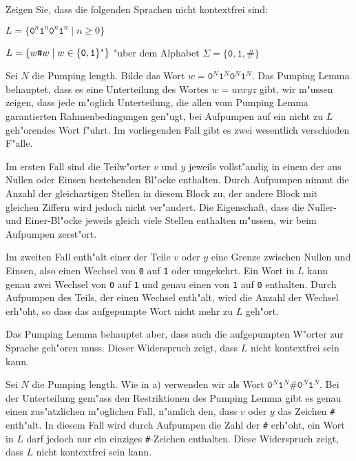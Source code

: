 Zeigen Sie, dass die folgenden Sprachen nicht kontextfrei sind:
\begin{teilaufgaben}
\item $L=\{\texttt{0}^n\texttt{1}^n\texttt{0}^n\texttt{1}^n\;|\;n\ge 0\}$
\item $L=\{w{\texttt{\#}}w\;|\;w\in\{{\tt 0},{\tt 1}\}^*\}$ "uber dem Alphabet
$\Sigma=\{\texttt{0},\texttt{1},\texttt{\#}\}$
\end{teilaufgaben}

\begin{loesung}
\begin{teilaufgaben}
\item Sei $N$ die Pumping length.
Bilde das Wort $w=\texttt{0}^N\texttt{1}^N\texttt{0}^N\texttt{1}^N$.
Das Pumping Lemma
behauptet, dass es eine Unterteilung des Wortes $w=uvxyz$ gibt, wir
m"ussen zeigen, dass jede m"oglich Unterteilung, die allen vom
Pumping Lemma garantierten Rahmenbedingungen gen"ugt, bei Aufpumpen
auf ein nicht zu $L$ geh"orendes Wort f"uhrt.
Im vorliegenden Fall
gibt es zwei wesentlich verschieden F"alle.

Im ersten Fall sind die
Teilw"orter $v$ und $y$ jeweils vollst"andig in einem der aus Nullen
oder Einsen bestehenden Bl"ocke enthalten. Durch Aufpumpen nimmt die
Anzahl der gleichartigen Stellen in diesem Block zu, der andere Block
mit gleichen Ziffern wird jedoch nicht ver"andert.
Die Eigenschaft, dass die Nuller- und
Einer-Bl"ocke jeweils gleich viele Stellen enthalten m"ussen, wir
beim Aufpumpen zerst"ort.

Im zweiten Fall enth"alt einer der Teile $v$ oder $y$ eine
Grenze zwischen Nullen und Einsen, also einen Wechsel von
\texttt{0} auf \texttt{1} oder umgekehrt.
Ein Wort in $L$ kann
genau zwei Wechsel von \texttt{0} auf \texttt{1} und genau einen
von \texttt{1} auf \texttt{0} enthalten.
Durch Aufpumpen des Teils,
der einen Wechsel enth"alt, wird die Anzahl der Wechsel erh"oht,
so dass das aufgepumpte Wort nicht mehr zu $L$ geh"ort.

Das Pumping Lemma behauptet aber, dass auch die aufgepumpten W"orter
zur Sprache geh"oren muss. Dieser Widerspruch zeigt, dass $L$
nicht kontextfrei sein kann.
\item Sei $N$ die Pumping length. Wie in a) verwenden wir als
Wort $\texttt{0}^N\texttt{1}^N\texttt{\#}\texttt{0}^N\texttt{1}^N$.
Bei der Unterteilung
gem"ass den Restriktionen des Pumping Lemma gibt es genau einen zus"atzlichen
m"oglichen Fall, n"amlich den, dass $v$ oder $y$ das Zeichen {\tt\#}
enth"alt.
In diesem Fall wird durch Aufpumpen die Zahl der {\tt\#}
erh"oht, ein Wort in $L$ darf jedoch nur ein einziges {\tt\#}-Zeichen
enthalten.
Diese Widerspruch zeigt, dass $L$ nicht kontextfrei sein kann.
\qedhere
\end{teilaufgaben}
\end{loesung}
